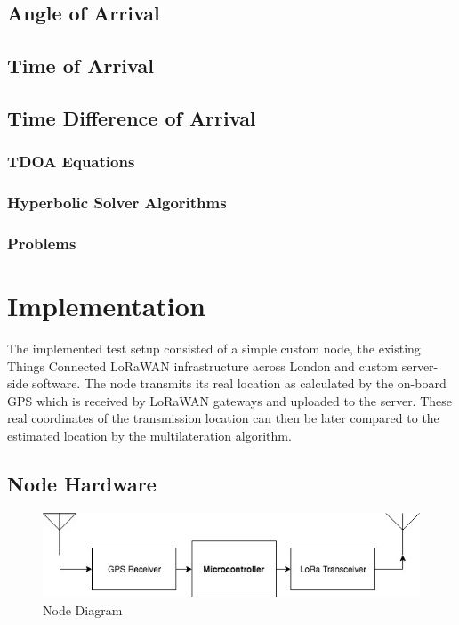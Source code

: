 \documentclass[a4paper]{report}
\begin{document}
  \section{Angle of Arrival}

  \section{Time of Arrival}

  \section{Time Difference of Arrival}
    \subsection{TDOA Equations}
    \subsection{Hyperbolic Solver Algorithms}
    \subsection{Problems}

\chapter{Implementation}

  The implemented test setup consisted of a simple custom node, the existing Things Connected LoRaWAN infrastructure across London and custom server-side software. The node transmits its real location as calculated by the on-board GPS which is received by LoRaWAN gateways and uploaded to the server. These real coordinates of the transmission location can then be later compared to the estimated location by the multilateration algorithm.

  \section{Node Hardware}
    \begin{figure}
    \centering
    \includegraphics[width=12cm]{figures/node.jpeg}
    \caption{Node Diagram}
    \label{fig:node}
    \end{figure}
\end{document}
